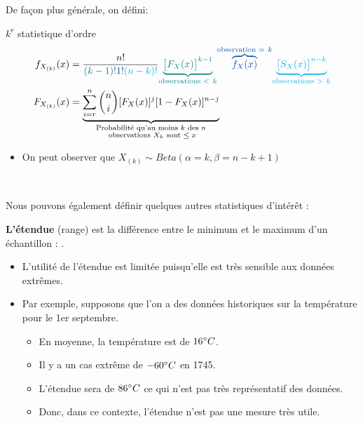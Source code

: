 \documentclass[10pt, french]{article}
\begin{document}
\begin{multicols*}{2}
De façon plus générale, on défini:
\begin{algo}{$k^{\text{e}}$ statistique d'ordre}
\begin{align*}
	f_{X_{(k)}}(x)
	&=	\frac{n!}{\textcolor{teal}{(k - 1)!} \textcolor{cobalt}{1!} \textcolor{cyan}{(n - k)!}} \textcolor{teal}{\underset{\text{observations } < \ k}{\underbrace{\big[ F_{X}(x) \big]^{k - 1}}}} \textcolor{cobalt}{\overset{\text{observation } = \ k}{\overbrace{f_{X}(x)}}} \textcolor{cyan}{\underset{\text{observations } > \ k}{\underbrace{\big[ S_{X}(x) \big]^{n - k}}}} \\
	F_{X_{(k)}}(x)
	&=	\underset{\substack{\text{Probabilité qu'au moins $k$ des $n$}\\ \text{ observations $X_{k}$  sont $\le x$}}}{\underbrace{\sum_{i = r}^{n} \binom{n}{i} [F_{X}(x)]^{j} [1 - F_{X}(x)]^{n - j}}}
\end{align*}

\begin{itemize}
	\item	On peut observer que $X_{(k)}	\sim	Beta(\alpha	=	k, \beta	=	n - k + 1)$
\end{itemize}
\end{algo}

\

Nous pouvons également définir quelques autres statistiques d'intérêt :
\begin{definitionNOHFILLsub}
\textbf{L'étendue} (range) est la différence entre le minimum et le maximum d'un échantillon : .\\

\begin{itemize}
	\item	L'utilité de l'étendue est limitée puisqu'elle est très sensible aux données extrêmes.
	\item	Par exemple, supposons que l’on a des données historiques sur la température pour le 1er septembre. 
		\begin{itemize}
		\item	En moyenne, la température est de $16\degree C$.
		\item	Il y a un cas extrême de $-60\degree C$ en 1745.
		\item	L'étendue sera de $86\degree C$ ce qui n'est pas très représentatif des données.
		\item	Donc, dans ce contexte, l'étendue n'est pas une mesure très utile.
		\end{itemize}
\end{itemize}
\end{definitionNOHFILLsub}



\end{multicols*}
\end{document}
